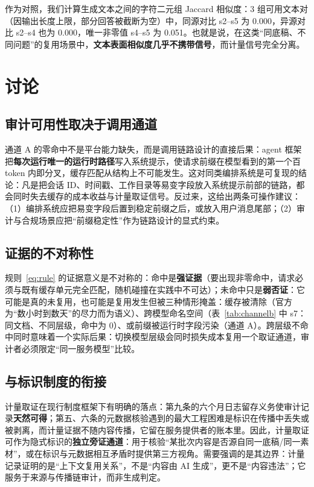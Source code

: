 \documentclass[11pt, a4paper]{ctexart}
\begin{document}
作为对照，我们计算生成文本之间的字符二元组 Jaccard 相似度：3 组可用文本对（因输出长度上限，部分回答被截断为空）中，同源对比 s2--s5 为 0.000，异源对比 s2--s4 也为 0.000，唯一非零值 s4--s5 为 0.051。也就是说，在这类“同底稿、不同问题”的复用场景中，\textbf{文本表面相似度几乎不携带信号}，而计量信号完全分离。

\section{讨论}
\label{sec:discussion}

\subsection{审计可用性取决于调用通道}
通道 A 的零命中不是平台能力缺失，而是调用链路设计的直接后果：agent 框架把\textbf{每次运行唯一的运行时路径}写入系统提示，使请求前缀在模型看到的第一个百 token 内即分叉，缓存匹配从结构上不可能发生。这对同类编排系统是可复现的结论：凡是把会话 ID、时间戳、工作目录等易变字段放入系统提示前部的链路，都会同时失去缓存的成本收益与计量取证信号。反过来，这给出两条可操作建议：（1）编排系统应把易变字段后置到稳定前缀之后，或放入用户消息尾部；（2）审计与合规场景应把“前缀稳定性”作为链路设计的显式约束。

\subsection{证据的不对称性}
规则~\eqref{eq:rule} 的证据意义是不对称的：命中是\textbf{强证据}（要出现非零命中，请求必须与既有缓存单元完全匹配，随机碰撞在实践中不可达）；未命中只是\textbf{弱否证}：它可能是真的未复用，也可能是复用发生但被三种情形掩盖：缓存被清除（官方为“数小时到数天”的尽力而为语义）、跨模型命名空间（表~\ref{tab:channelb} 中 s7：同文档、不同层级，命中为 0）、或前缀被运行时字段污染（通道 A）。跨层级不命中同时意味着一个实际后果：切换模型层级会同时损失成本复用一个取证通道，审计者必须限定“同一服务模型”比较。

\subsection{与标识制度的衔接}
计量取证在现行制度框架下有明确的落点：第九条的六个月日志留存义务使审计记录\textbf{天然可得}；第五、六条的元数据核验遇到的最大工程困难是标识在传播中丢失或被剥离，而计量证据不随内容传播，它留在服务提供者的账本里。因此，计量取证可作为隐式标识的\textbf{独立旁证通道}：用于核验“某批次内容是否源自同一底稿/同一素材”，或在标识与元数据相互矛盾时提供第三方视角。需要强调的是其边界：计量记录证明的是“上下文复用关系”，不是“内容由 AI 生成”，更不是“内容违法”；它服务于来源与传播链审计，而非生成判定。
\end{document}
